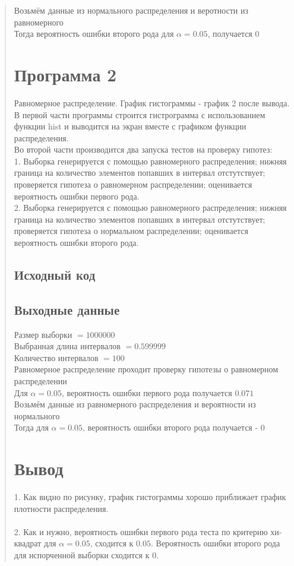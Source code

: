 \documentclass{article}
\begin{document}
\begin{quote}
	Возьмём данные из нормального распределения и веротности из равномерного \\
	Тогда вероятность ошибки второго рода для $\alpha = 0.05$, получается $0$
\section{Программа 2}
	Равномерное распределение. График гистограммы - график 2 после вывода. \\
	В первой части программы строится гистрограмма с использованием функции hist и выводится на экран вместе с графиком функции распределения. \\
	Во второй части производится два запуска тестов на проверку гипотез: \\
	1. Выборка генерируется с помощью равномерного распределения; нижняя граница на количество элементов попавших в интервал отстутствует; проверяется гипотеза о равномерном распределении; оценивается вероятность ошибки первого рода. \\
	2. Выборка генерируется с помощью равномерного распределения; нижняя граница на количество элементов попавших в интервал отстутствует; проверяется гипотеза о нормальном распределении; оценивается вероятность ошибки второго рода. \\
\subsection{Исходный код}
	
\subsection{Выходные данные}
	Размер выборки $= 1000000$ \\
	Выбранная длина интервалов $= 0.599999$ \\
	Количество интервалов $= 100$ \\

	Равномерное распределение проходит проверку гипотезы о равномерном распределении \\
	Для $\alpha = 0.05$, вероятность ошибки первого рода получается $0.071$ \\

	Возьмём данные из равномерного распределения и вероятности из нормального \\
	Тогда для $\alpha = 0.05$, вероятность ошибки второго рода получается - $0$ 
\section{Вывод}
	1. Как видно по рисунку, график гистограммы хорошо приближает график плотности распределения. \\ \\
        2. Как и нужно, вероятность ошибки первого рода теста по критерию хи-квадрат для $\alpha = 0.05$, сходится к $0.05$. Вероятность ошибки второго рода для испорченной выборки сходится к $0$.


\end{quote}
\end{document}
